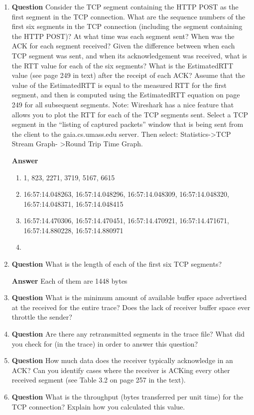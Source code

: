 \documentclass[12pt,letterpaper]{article}
\newcommand{\q}{\textbf{Question} }
\newcommand{\ans}{\textbf{Answer} }
\begin{document}
\begin{enumerate}[resume]
\item \q Consider the TCP segment containing the HTTP POST as the first segment
in the TCP connection. What are the sequence numbers of the first six segments
in the TCP connection (including the segment containing the HTTP POST)?  At
what time was each segment sent?  When was the ACK for each segment received?
Given the difference between when each TCP segment was sent, and when its
acknowledgement was received, what is the RTT value for each of the six
segments?  What is the EstimatedRTT value (see page 249 in text) after the
receipt of each ACK?  Assume that the value of the EstimatedRTT is equal to the
measured RTT for the first segment, and then is computed using the EstimatedRTT
equation on page 249 for all subsequent segments.  Note: Wireshark has a nice
feature that allows you to plot the RTT for each of the TCP segments sent.
Select a TCP segment in the “listing of captured packets” window that is being
sent from the client to the gaia.cs.umass.edu server.  Then select:
Statistics->TCP Stream Graph- >Round Trip Time Graph.  

\ans
\begin{enumerate}
    \item 1, 823, 2271, 3719, 5167, 6615
    \item 16:57:14.048263, 16:57:14.048296, 16:57:14.048309, 16:57:14.048320,
        16:57:14.048371, 16:57:14.048415
    \item 16:57:14.470306, 16:57:14.470451, 16:57:14.470921, 16:57:14.471671,
        16:57:14.880228, 16:57:14.880971
    \item 
\end{enumerate}

\item \q What is the length of each of the first six TCP segments?

\ans Each of them are 1448 bytes 

\item \q What is the minimum amount of available buffer space advertised at the
received for the entire trace?  Does the lack of receiver buffer space ever
throttle the sender?  

\item \q Are there any retransmitted segments in the trace file? What did you
check for (in the trace) in order to answer this question?  

\item \q How much data does the receiver typically acknowledge in an ACK?  Can
you identify cases where the receiver is ACKing every other received segment
(see Table 3.2 on page 257 in the text).  

\item \q What is the throughput (bytes transferred per unit time) for the TCP
connection?  Explain how you calculated this value.  
\end{enumerate}
\end{document}
